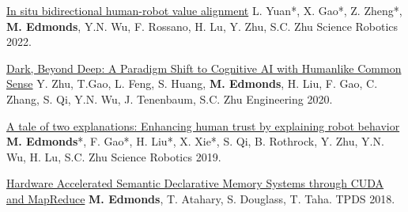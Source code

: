 


\begin{cvpublications}

\item \cvpublication
{\href{https://www.science.org/stoken/author-tokens/ST-617/full}{In situ bidirectional human-robot value alignment}} %
{L. Yuan*, X. Gao*, Z. Zheng*, \textbf{M. Edmonds}, Y.N. Wu, F. Rossano, H. Lu, Y. Zhu, S.C. Zhu} %
{Science Robotics 2022.} %
{} %

\item \cvpublication
{\href{https://mjedmonds.com/papers/2020_dark_beyond_deep.pdf}{Dark, Beyond Deep: A Paradigm Shift to Cognitive AI with Humanlike Common Sense}} %
{Y. Zhu, T.Gao, L. Feng, S. Huang, \textbf{M. Edmonds}, H. Liu, F. Gao, C. Zhang, S. Qi, Y.N. Wu, J. Tenenbaum, S.C. Zhu} %
{Engineering 2020.} %
{} %

\item \cvpublication
{\href{http://robotics.sciencemag.org/cgi/content/full/4/37/eaay4663?ijkey=fn9h.cykmWa7.&keytype=ref&siteid=robotics}{A tale of two explanations: Enhancing human trust by explaining robot behavior}} %
{\textbf{M. Edmonds}*, F. Gao*, H. Liu*, X. Xie*, S. Qi, B. Rothrock, Y. Zhu, Y.N. Wu, H. Lu, S.C. Zhu} %
{Science Robotics 2019.} %
{} %

\item \cvpublication
{\href{http://www.mjedmonds.com/projects/DM/TPDS18_HADM_final.pdf}{Hardware Accelerated Semantic Declarative Memory Systems through CUDA and MapReduce}} %
{\textbf{M. Edmonds}, T. Atahary, S. Douglass, T. Taha.} %
{TPDS 2018.} %
{} %

\cvequalcontribution

\end{cvpublications}